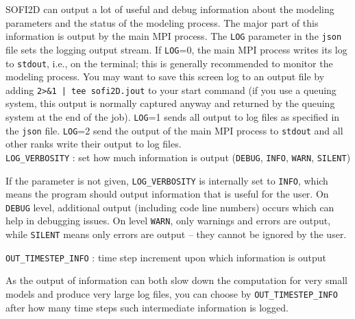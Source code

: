 SOFI2D can output a lot of useful and debug information about the modeling parameters and the status of the modeling process. The major part of this information is output by the main MPI process. The \texttt{LOG} parameter in the \texttt{json} file sets the logging output stream. If \texttt{LOG}=0, the main MPI process writes its log to \texttt{stdout}, i.e., on the terminal; this is generally recommended  to monitor the modeling process. You may want to save this screen log to an output file by adding \texttt{2>\&1 | tee sofi2D.jout} to your start command (if you use a queuing system, this output is normally captured anyway and returned by the queuing system at the end of the job). \texttt{LOG}=1 sends all output to log files as specified in the \texttt{json} file. \texttt{LOG}=2 send the output of the main MPI process to \texttt{stdout} and all other ranks write their output to log files.\\

\texttt{LOG\_VERBOSITY} : set how much information is output (\texttt{DEBUG}, \texttt{INFO}, \texttt{WARN}, \texttt{SILENT})

If the parameter is not given, \texttt{LOG\_VERBOSITY} is internally set to \texttt{INFO}, which means the program should output information that is useful for the user. On \texttt{DEBUG} level, additional output (including code line numbers) occurs which can help in debugging issues. On level \texttt{WARN}, only warnings and errors are output, while \texttt{SILENT} means only errors are output -- they cannot be ignored by the user.

\texttt{OUT\_TIMESTEP\_INFO} : time step increment upon which information is output

As the output of information can both slow down the computation for very small models and produce very large log files, you can choose by \texttt{OUT\_TIMESTEP\_INFO} after how many time steps such intermediate information is logged.


